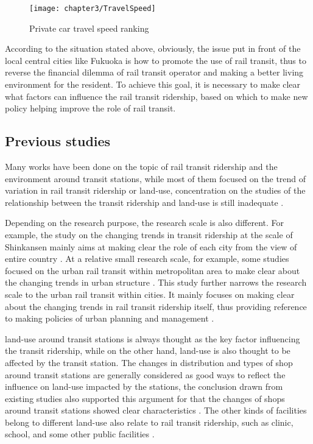 %
\begin{figure}[htbp]
	\centering
	\texttt{[image: chapter3/TravelSpeed]}
	\caption{Private car travel speed ranking}
	\label{fig:chp3:TravelSpeed}
\end{figure}

%
According to the situation stated above, obviously, the issue put in front of the local central cities like Fukuoka is how to promote the use of rail transit, thus to reverse the financial dilemma of rail transit operator and making a better living environment for the resident. To achieve this goal, it is necessary to make clear what factors can influence the rail transit ridership, based on which to make new policy helping improve the role of rail transit.

%
\subsection{Previous studies}
%
Many works have been done on the topic of rail transit ridership and the environment around transit stations, while most of them focused on the trend of variation in rail transit ridership or land-use, concentration on the studies of the relationship between the transit ridership and land-use is still inadequate \cite{matsumoto2013study,nakamura2015study}. 

%
Depending on the research purpose, the research scale is also different. For example, the study on the changing trends in transit ridership at the scale of Shinkansen mainly aims at making clear the role of each city from the view of entire country \cite{matsumoto2013study}. At a relative small research scale, for example, some studies focused on the urban rail transit within metropolitan area to make clear about the changing trends in urban structure \cite{song2013evaluation,baba2012change}. This study further narrows the research scale to the urban rail transit within cities. It mainly focuses on making clear about the changing trends in rail transit ridership itself, thus providing reference to making policies of urban planning and management \cite{nakamura2015study,yano2008}. 

%
land-use around transit stations is always thought as the key factor influencing the transit ridership, while on the other hand, land-use is also thought to be affected by the transit station. The changes in distribution and types of shop around transit stations are generally considered as good ways to reflect the influence on land-use impacted by the stations, the conclusion drawn from existing studies also supported this argument for that the changes of shops around transit stations showed clear characteristics \cite{sui2013research,zhao2012study,kitayama2008study}. The other kinds of facilities belong to different land-use also relate to rail transit ridership, such as clinic, school, and some other public facilities \cite{lee1995predicting,lee1994temporal}. 

